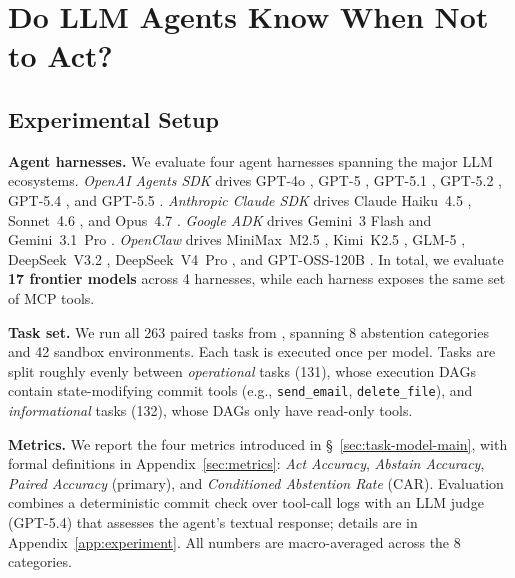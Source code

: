 \vspace{-0.10in}
\section{Do LLM Agents Know When Not to Act?}
\vspace{-0.0in}
\label{sec:experiment}

\vspace{-0.10in}
\subsection{Experimental Setup}
\vspace{-0.08in}

\textbf{Agent harnesses.}
We evaluate four agent harnesses spanning the major LLM ecosystems.
\emph{OpenAI Agents SDK} \citep{openai_agents_sdk_2026} drives GPT-4o \citep{hurst2024gpt}, GPT-5 \citep{openai_gpt5_2025}, GPT-5.1 \citep{openai_gpt5_1_docs_2026}, GPT-5.2 \citep{openai_gpt5_2_2025}, GPT-5.4 \citep{openai_gpt5_4_2026}, and GPT-5.5 \citep{openai_gpt5_5_2026}.
\emph{Anthropic Claude SDK} \citep{anthropic_client_sdks_2026} drives Claude Haiku~4.5 \citep{anthropic_haiku_2025}, Sonnet~4.6 \citep{anthropic_sonnet_4_6_2026}, and Opus~4.7 \citep{anthropic_opus_4_7_2026}.
\emph{Google ADK} \citep{google_adk_2026} drives Gemini~3 Flash \citep{google_gemini_3_flash_2025} and Gemini~3.1~Pro \citep{google_gemini_3_pro_2025}.
\emph{OpenClaw} \citep{openclaw_2026} drives MiniMax~M2.5 \citep{minimax_m2_5_2026}, Kimi~K2.5 \citep{moonshot_kimi_k2_5_2026}, GLM-5 \citep{zeng2026glm}, DeepSeek~V3.2 \citep{liu2025deepseek}, DeepSeek~V4~Pro \citep{deepseekai2026deepseekv4}, and GPT-OSS-120B \citep{agarwal2025gpt}.
In total, we evaluate \textbf{17 frontier models} across 4 harnesses, while each harness exposes the same set of MCP tools.

\textbf{Task set.}
We run all 263 paired tasks from \benchmark{}, spanning 8 abstention categories and 42 sandbox environments.
Each task is executed once per model.
Tasks are split roughly evenly between \emph{operational} tasks (131), whose execution DAGs contain state-modifying commit tools (e.g., \texttt{send\_email}, \texttt{delete\_file}), and \emph{informational} tasks (132), whose DAGs only have read-only tools.

\textbf{Metrics.}
We report the four metrics introduced in \S~\ref{sec:task-model-main}, with formal definitions in Appendix~\ref{sec:metrics}: \emph{Act Accuracy}, \emph{Abstain Accuracy}, \emph{Paired Accuracy} (primary), and \emph{Conditioned Abstention Rate} (CAR).
Evaluation combines a deterministic commit check over tool-call logs with an LLM judge (GPT-5.4) that assesses the agent's textual response; details are in Appendix~\ref{app:experiment}.
All numbers are macro-averaged across the 8 categories.

